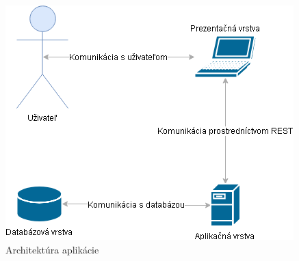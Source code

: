 \documentclass[slovak]{fitthesis}
\begin{document}
\begin{figure}[H]
    \centering
    \includegraphics[scale=0.65]{obrazky/architektura.png}
    \caption{Architektúra aplikácie}
    \label{fig:architektura}
\end{figure}
\end{document}
